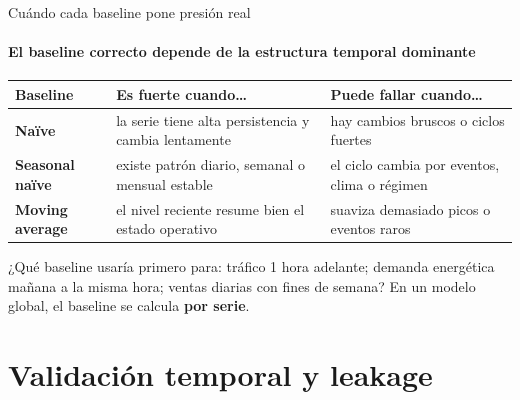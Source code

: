 \documentclass[aspectratio=169,11pt]{beamer}  %
\newcommand{\hrow}{\rowcolor{mlcream}}
\begin{document}
\begin{frame}{Cuándo cada baseline pone presión real}
\framesubtitle{El baseline correcto depende de la estructura temporal dominante}
\centering\small
\begin{tabular}{@{}l P{0.35\textwidth} P{0.35\textwidth}@{}}
\toprule
\hrow \textbf{Baseline} & Es fuerte cuando\ldots & Puede fallar cuando\ldots\\
\midrule
\textbf{Naïve} & la serie tiene alta persistencia y cambia lentamente & hay cambios bruscos o ciclos fuertes\\
\textbf{Seasonal naïve} & existe patrón diario, semanal o mensual estable & el ciclo cambia por eventos, clima o régimen\\
\textbf{Moving average} & el nivel reciente resume bien el estado operativo & suaviza demasiado picos o eventos raros\\
\bottomrule
\end{tabular}
\raggedright
\begin{taskbox}[Práctica]
\small ¿Qué baseline usaría primero para: tráfico 1 hora adelante; demanda energética mañana a la misma hora; ventas diarias con fines de semana? En un modelo global, el baseline se calcula \textbf{por serie}.
\end{taskbox}
\end{frame}

\section{Validación temporal y leakage}
\end{document}
